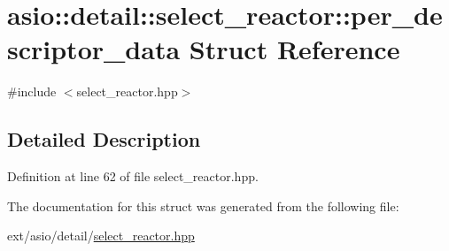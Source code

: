 \hypertarget{structasio_1_1detail_1_1select__reactor_1_1per__descriptor__data}{}\section{asio\+:\+:detail\+:\+:select\+\_\+reactor\+:\+:per\+\_\+descriptor\+\_\+data Struct Reference}
\label{structasio_1_1detail_1_1select__reactor_1_1per__descriptor__data}


{\ttfamily \#include $<$select\+\_\+reactor.\+hpp$>$}



\subsection{Detailed Description}


Definition at line 62 of file select\+\_\+reactor.\+hpp.



The documentation for this struct was generated from the following file\+:\begin{DoxyCompactItemize}
\item 
ext/asio/detail/\hyperlink{select__reactor_8hpp}{select\+\_\+reactor.\+hpp}\end{DoxyCompactItemize}
